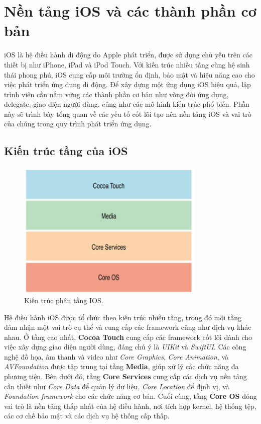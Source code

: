 
\section{Nền tảng iOS và các thành phần cơ bản}
iOS là hệ điều hành di động do Apple phát triển, được sử dụng chủ yếu trên các thiết bị như iPhone, iPad và iPod Touch. Với kiến trúc nhiều tầng cùng hệ sinh thái phong phú, iOS cung cấp môi trường ổn định, bảo mật và hiệu năng cao cho việc phát triển ứng dụng di động. Để xây dựng một ứng dụng iOS hiệu quả, lập trình viên cần nắm vững các thành phần cơ bản như vòng đời ứng dụng, delegate, giao diện người dùng, cũng như các mô hình kiến trúc phổ biến. Phần này sẽ trình bày tổng quan về các yếu tố cốt lõi tạo nên nền tảng iOS và vai trò của chúng trong quy trình phát triển ứng dụng.
    \subsection{Kiến trúc tầng của iOS}
        \begin{flushleft}
            \begin{figure}[H] %
                \centering
                \includegraphics[width=0.8\textwidth]{images/kientrucios.png}
                \caption{Kiến trúc phân tầng IOS\cite{kientrucios}.}
                \label{fig:kientrucios}
            \end{figure}

            Hệ điều hành iOS được tổ chức theo kiến trúc nhiều tầng, trong đó mỗi tầng đảm nhận một vai trò cụ thể và cung cấp các framework cũng như dịch vụ khác nhau. Ở tầng cao nhất, \textbf{Cocoa Touch} cung cấp các framework cốt lõi dành cho việc xây dựng giao diện người dùng, đáng chú ý là \textit{UIKit} và \textit{SwiftUI}. Các công nghệ đồ họa, âm thanh và video như \textit{Core Graphics}, \textit{Core Animation}, và \textit{AVFoundation} được tập trung tại tầng \textbf{Media}, giúp xử lý các chức năng đa phương tiện. Bên dưới đó, tầng \textbf{Core Services} cung cấp các dịch vụ nền tảng cần thiết như \textit{Core Data} để quản lý dữ liệu, \textit{Core Location} để định vị, và \textit{Foundation framework} cho các chức năng cơ bản. Cuối cùng, tầng \textbf{Core OS} đóng vai trò là nền tảng thấp nhất của hệ điều hành, nơi tích hợp kernel, hệ thống tệp, các cơ chế bảo mật và các dịch vụ hệ thống cấp thấp.

       
        \end{flushleft}
